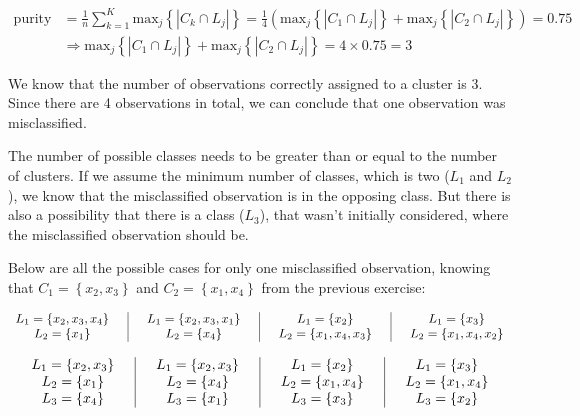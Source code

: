 \documentclass[12pt]{article}
\begin{document}
\begin{enumerate}[leftmargin=\labelsep]
          \vskip -0.5cm
          \begin{align*}
              \text{purity} & = \frac{1}{n} \sum_{k=1}^K \text{max}_j\left\{\left|C_k \cap L_j\right|\right\}
                            = \frac{1}{4} \left(\text{max}_j\left\{\left|C_1 \cap L_j\right|\right\} + \text{max}_j\left\{\left|C_2 \cap L_j\right|\right\}\right) = 0.75 \\
              & \Rightarrow \text{max}_j\left\{\left|C_1 \cap L_j\right|\right\} + \text{max}_j\left\{\left|C_2 \cap L_j\right|\right\} = 4 \times 0.75 = 3
          \end{align*}

          We know that the number of observations correctly assigned to a cluster is 3. Since there are 4 observations in total, we can conclude that one observation was
          misclassified.

          The number of possible classes needs to be greater than or equal to the number of clusters. If we assume the minimum number of classes, which is two ($L_1$ and $L_2$),
          we know that the misclassified observation is in the opposing class. But there is also a possibility that there is a class ($L_3$), that wasn't initially considered,
          where the misclassified observation should be.

          Below are all the possible cases for only one misclassified observation, knowing that $C_1 = \left\{x_2, x_3\right\}$ and $C_2 = \left\{x_1, x_4\right\}$ from the previous exercise:

          \begin{equation}\label{exI4-purity-cases-1}
              \begin{array}{c|c|c|c}
                  \centering
                  L_1 = \left\{x_2, x_3, x_4\right\} \quad & \quad L_1 = \left\{x_2, x_3, x_1\right\} \quad & \quad L_1 = \left\{x_2\right\} \quad & \quad L_1 = \left\{x_3\right\} \\
                  L_2 = \left\{x_1\right\} \quad & \quad L_2 = \left\{x_4\right\} \quad & \quad L_2 = \left\{x_1, x_4, x_3\right\} \quad & \quad L_2 = \left\{x_1, x_4, x_2\right\}
              \end{array}
          \end{equation}

          \begin{equation}\label{exI4-purity-cases-2}
              \begin{array}{c|c|c|c}
                  \centering
                  L_1 = \left\{x_2, x_3\right\} \quad & \quad L_1 = \left\{x_2, x_3\right\} \quad & \quad L_1 = \left\{x_2\right\} \quad & \quad L_1 = \left\{x_3\right\} \\
                  L_2 = \left\{x_1\right\} \quad & \quad L_2 = \left\{x_4\right\} \quad & \quad L_2 = \left\{x_1, x_4\right\} \quad & \quad L_2 = \left\{x_1, x_4\right\} \\
                  L_3 = \left\{x_4\right\} \quad & \quad L_3 = \left\{x_1\right\} \quad & \quad L_3 = \left\{x_3\right\} \quad & \quad L_3 = \left\{x_2\right\}
              \end{array}
          \end{equation}


\end{enumerate}
\end{document}
